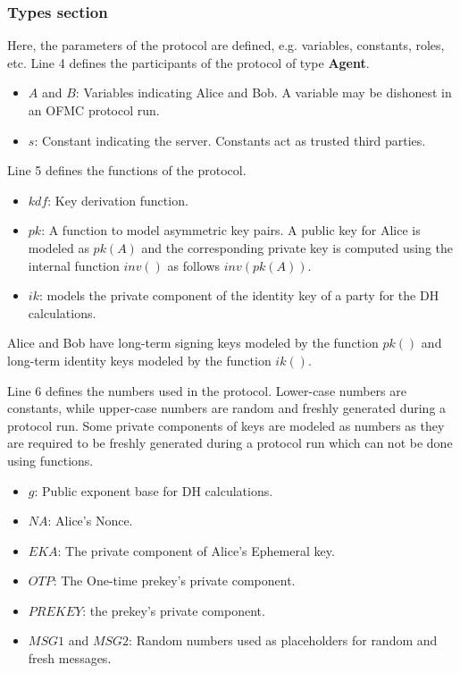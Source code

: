 \subsubsection{Types section} 
Here, the parameters of the protocol are defined, e.g. variables, constants, roles, etc. Line 4 defines the participants of the protocol of type \textbf{Agent}.
\begin{itemize}
	\item $A$ and $B$: Variables indicating Alice and Bob. A variable may be dishonest in an OFMC protocol run.
	\item $s$: Constant indicating the server. Constants act as trusted third parties.
\end{itemize}
\par
Line 5 defines the functions of the protocol.
\begin{itemize}
	\item $kdf$: Key derivation function.
	\item $pk$: A function to model asymmetric key pairs. A public key for Alice is modeled as $pk(A)$ and the corresponding private key is computed using the internal function $inv()$ as follows $inv(pk(A))$.
	\item $ik$: models the private component of the identity key of a party for the DH calculations.
\end{itemize}
	Alice and Bob have long-term signing keys modeled by the function $pk()$ and long-term identity keys modeled by the function $ik()$.
	\par
Line 6 defines the numbers used in the protocol. Lower-case numbers are constants, while upper-case numbers are random and freshly generated during a protocol run. Some private components of keys are modeled as numbers as they are required to be freshly generated during a protocol run which can not be done using functions.
\begin{itemize}
	\item $g$: Public exponent base for DH calculations.
	\item $NA$: Alice's Nonce.
	\item $EKA$: The private component of Alice's Ephemeral key.
	\item $OTP$: The One-time prekey's private component.
	\item $PREKEY$: the prekey's private component.
	\item $MSG1$ and $MSG2$: Random numbers used as placeholders for random and fresh messages.
\end{itemize}

